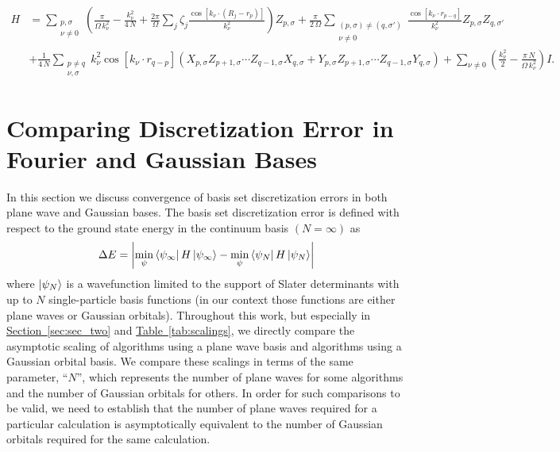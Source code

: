 \documentclass[superscriptaddress,aps,pra,nofootinbib,notitlepage,10pt,longbibliography]{revtex4-1}
\renewcommand{\sec}[1]{\hyperref[sec:#1]{Section~\ref*{sec:#1}}}
\newcommand{\tab}[1]{\hyperref[tab:#1]{Table~\ref*{tab:#1}}}
\def\bra#1{\mathinner{\langle{#1}|}}
\def\ket#1{\mathinner{|{#1}\rangle}}
\begin{document}
\begin{align}
\label{eq:qubit_ham}
H & =  \sum_{\substack{p, \sigma \\ \nu \neq 0}}\left(\frac{\pi}{\Omega \, k_\nu^2}  - \frac{k_\nu^2}{4 \, N} + \frac{2\pi}{\Omega} \sum_{j}\zeta_j \frac{\cos\left[ k_{\nu} \cdot \left(R_j - r_{p}\right)\right] }{k_\nu^2}\right) Z_{p,\sigma}
%
+ \frac{\pi}{2\,\Omega } \sum_{\substack{(p, \sigma) \neq (q, \sigma') \\ \nu \neq 0}} \frac{\cos \left[k_\nu \cdot r_{p-q}\right]}{k_\nu^2} Z_{p,\sigma} Z_{q,\sigma'}\\
%
& + \frac{1}{4\, N} \sum_{\substack{p \neq q \\ \nu, \sigma}} k_\nu^2 \cos \left[k_\nu \cdot r_{q - p} \right] \left(X_{p,\sigma} Z_{p + 1,\sigma} \cdots Z_{q - 1,\sigma} X_{q,\sigma} + Y_{p,\sigma} Z_{p + 1,\sigma} \cdots Z_{q - 1,\sigma} Y_{q,\sigma} \right)
%
+ \sum_{\nu \neq 0} \left(\frac{k_\nu^2}{2}- \frac{\pi \, N}{\Omega \, k_\nu^2} \right) I\nonumber.
\end{align}




\section{Comparing Discretization Error in Fourier and Gaussian Bases}
\label{app:basis_errors}

In this section we discuss convergence of basis set discretization errors in both plane wave and Gaussian bases. The basis set discretization error is defined with respect to the ground state energy in the continuum basis $(N = \infty)$ as
\begin{equation}
\Delta E = \left | \min_{\psi} \bra{\psi_\infty} H \ket{\psi_\infty} - \min_{\psi} \bra{\psi_N} H \ket{\psi_N}\right|
\end{equation}
where $\ket{\psi_N}$ is a wavefunction limited to the support of Slater determinants with up to $N$ single-particle basis functions (in our context those functions are either plane waves or Gaussian orbitals). Throughout this work, but especially in \sec{sec_two} and \tab{scalings}, we directly compare the asymptotic scaling of algorithms using a plane wave basis and algorithms using a Gaussian orbital basis. We compare these scalings in terms of the same parameter, ``$N$'', which represents the number of plane waves for some algorithms and the number of Gaussian orbitals for others. In order for such comparisons to be valid, we need to establish that the number of plane waves required for a particular calculation is asymptotically equivalent to the number of Gaussian orbitals required for the same calculation.
\end{document}
